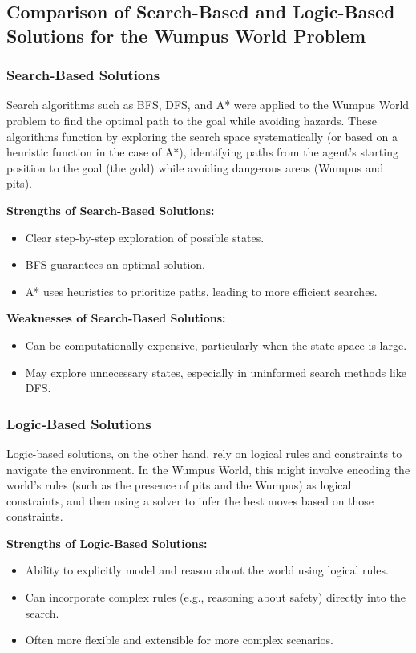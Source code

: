 \documentclass[12pt]{article}
\begin{document}
\subsection{Comparison of Search-Based and Logic-Based Solutions for the Wumpus World Problem}
\subsubsection{Search-Based Solutions}
Search algorithms such as BFS, DFS, and A* were applied to the Wumpus World problem to find the optimal path to the goal while avoiding hazards. These algorithms function by exploring the search space systematically (or based on a heuristic function in the case of A*), identifying paths from the agent's starting position to the goal (the gold) while avoiding dangerous areas (Wumpus and pits).

\textbf{Strengths of Search-Based Solutions:}
\begin{itemize}
    \item Clear step-by-step exploration of possible states.
    \item BFS guarantees an optimal solution.
    \item A* uses heuristics to prioritize paths, leading to more efficient searches.
\end{itemize}

\textbf{Weaknesses of Search-Based Solutions:}
\begin{itemize}
    \item Can be computationally expensive, particularly when the state space is large.
    \item May explore unnecessary states, especially in uninformed search methods like DFS.
\end{itemize}

\subsubsection{Logic-Based Solutions}
Logic-based solutions, on the other hand, rely on logical rules and constraints to navigate the environment. In the Wumpus World, this might involve encoding the world’s rules (such as the presence of pits and the Wumpus) as logical constraints, and then using a solver to infer the best moves based on those constraints.

\textbf{Strengths of Logic-Based Solutions:}
\begin{itemize}
    \item Ability to explicitly model and reason about the world using logical rules.
    \item Can incorporate complex rules (e.g., reasoning about safety) directly into the search.
    \item Often more flexible and extensible for more complex scenarios.
\end{itemize}
\end{document}
